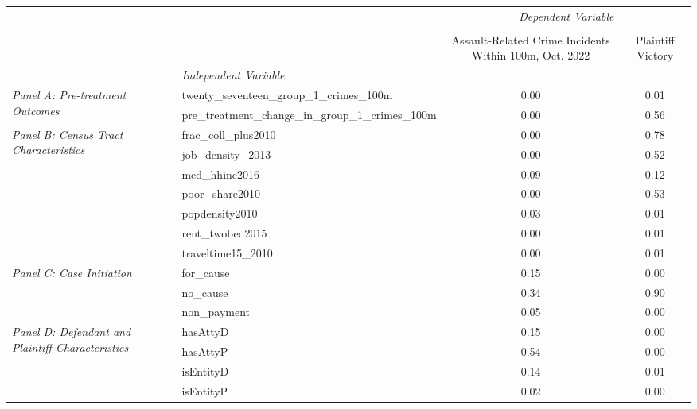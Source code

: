 \begin{tabular}{llcc}
\toprule
 &  & \multicolumn{2}{c}{\textit{Dependent Variable}} \\
\cline{3-4}
\\
 &  & Assault-Related Crime Incidents Within 100m, Oct. 2022 & Plaintiff Victory \\
 & \emph{Independent Variable} &  &  \\
\midrule
\multirow[c]{2}{3cm}{\textit{Panel A: Pre-treatment Outcomes}} & twenty_seventeen_group_1_crimes_100m & 0.00 & 0.01 \\
 & pre_treatment_change_in_group_1_crimes_100m & 0.00 & 0.56 \\
\cline{1-4}
\multirow[c]{7}{3cm}{\textit{Panel B: Census Tract Characteristics}} & frac_coll_plus2010 & 0.00 & 0.78 \\
 & job_density_2013 & 0.00 & 0.52 \\
 & med_hhinc2016 & 0.09 & 0.12 \\
 & poor_share2010 & 0.00 & 0.53 \\
 & popdensity2010 & 0.03 & 0.01 \\
 & rent_twobed2015 & 0.00 & 0.01 \\
 & traveltime15_2010 & 0.00 & 0.01 \\
\cline{1-4}
\multirow[c]{3}{3cm}{\textit{Panel C: Case Initiation}} & for_cause & 0.15 & 0.00 \\
 & no_cause & 0.34 & 0.90 \\
 & non_payment & 0.05 & 0.00 \\
\cline{1-4}
\multirow[c]{4}{3cm}{\textit{Panel D: Defendant and Plaintiff Characteristics}} & hasAttyD & 0.15 & 0.00 \\
 & hasAttyP & 0.54 & 0.00 \\
 & isEntityD & 0.14 & 0.01 \\
 & isEntityP & 0.02 & 0.00 \\
\cline{1-4}
\bottomrule
\end{tabular}
